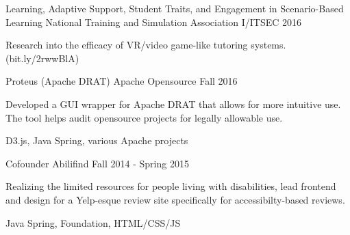 

\begin{cventries}

  \cventry
    {Learning, Adaptive Support, Student Traits, and Engagement in Scenario-Based Learning} %
    {National Training and Simulation Association} %
    {}
    {I/ITSEC 2016} %
    {
      \begin{cvitems} %
        \item {Research into the efficacy of VR/video game-like tutoring systems. (bit.ly/2rwwBlA)}
      \end{cvitems}
    }
  \cventry
    {Proteus (Apache DRAT)} %
    {Apache Opensource} %
    {}
    {Fall 2016} %
    {
      \begin{cvitems} %
        \item {Developed a GUI wrapper for Apache DRAT that allows for more intuitive use. The tool helps audit opensource projects for legally allowable use.}
        \item {D3.js, Java Spring, various Apache projects}
      \end{cvitems}
    }
    \linebreak
    \linebreak
    \linebreak
  \cventry
    {Cofounder} %
    {Abilifind} %
    {}
    {Fall 2014 - Spring 2015} %
    {
      \begin{cvitems} %
        \item {Realizing the limited resources for people living with disabilities, lead frontend and design for a Yelp-esque review site specifically for accessibilty-based reviews.}
        \item {Java Spring, Foundation, HTML/CSS/JS}
      \end{cvitems}
    }
\end{cventries}
